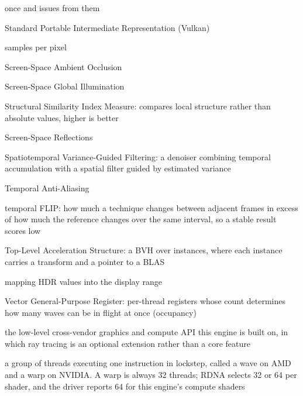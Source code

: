 \begin{description}
    once and issues from them
  \item[SPIR-V] Standard Portable Intermediate Representation (Vulkan)
  \item[spp] samples per pixel
  \item[SSAO] Screen-Space Ambient Occlusion
  \item[SSGI] Screen-Space Global Illumination
  \item[SSIM] Structural Similarity Index Measure: compares local structure rather than absolute
    values, higher is better
  \item[SSR] Screen-Space Reflections
  \item[SVGF] Spatiotemporal Variance-Guided Filtering: a denoiser combining temporal accumulation
    with a spatial filter guided by estimated variance
  \item[TAA] Temporal Anti-Aliasing
  \item[tFLIP] temporal FLIP: how much a technique changes between adjacent frames in excess of how
    much the reference changes over the same interval, so a stable result scores low
  \item[TLAS] Top-Level Acceleration Structure: a BVH over instances, where each instance carries a
    transform and a pointer to a BLAS
  \item[tonemap] mapping HDR values into the display range
  \item[VGPR] Vector General-Purpose Register: per-thread registers whose count determines how many
    waves can be in flight at once (occupancy)
  \item[Vulkan] the low-level cross-vendor graphics and compute API this engine is built on, in
    which ray tracing is an optional extension rather than a core feature
  \item[wave / warp] a group of threads executing one instruction in lockstep, called a wave on AMD
    and a warp on NVIDIA. A warp is always 32 threads; RDNA selects 32 or 64 per shader, and the
    driver reports 64 for this engine's compute shaders
  \end{description}
